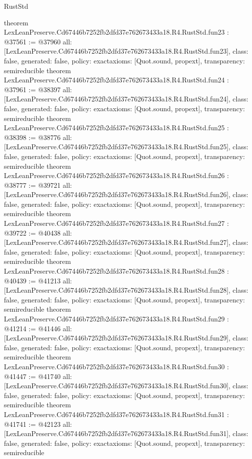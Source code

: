 \begin{lexlean}{RustStd}
\begin{coremodule}
{}
theorem LexLeanPreserve.Cd67446b7252fb2dfd37e762673433a18.R4.RustStd.fun23 : @37561 := @37960 {
  all: [LexLeanPreserve.Cd67446b7252fb2dfd37e762673433a18.R4.RustStd.fun23],
  class: false,
  generated: false,
  policy: exact{axioms: [Quot.sound, propext]},
  transparency: semireducible
}
theorem LexLeanPreserve.Cd67446b7252fb2dfd37e762673433a18.R4.RustStd.fun24 : @37961 := @38397 {
  all: [LexLeanPreserve.Cd67446b7252fb2dfd37e762673433a18.R4.RustStd.fun24],
  class: false,
  generated: false,
  policy: exact{axioms: [Quot.sound, propext]},
  transparency: semireducible
}
theorem LexLeanPreserve.Cd67446b7252fb2dfd37e762673433a18.R4.RustStd.fun25 : @38398 := @38776 {
  all: [LexLeanPreserve.Cd67446b7252fb2dfd37e762673433a18.R4.RustStd.fun25],
  class: false,
  generated: false,
  policy: exact{axioms: [Quot.sound, propext]},
  transparency: semireducible
}
theorem LexLeanPreserve.Cd67446b7252fb2dfd37e762673433a18.R4.RustStd.fun26 : @38777 := @39721 {
  all: [LexLeanPreserve.Cd67446b7252fb2dfd37e762673433a18.R4.RustStd.fun26],
  class: false,
  generated: false,
  policy: exact{axioms: [Quot.sound, propext]},
  transparency: semireducible
}
theorem LexLeanPreserve.Cd67446b7252fb2dfd37e762673433a18.R4.RustStd.fun27 : @39722 := @40438 {
  all: [LexLeanPreserve.Cd67446b7252fb2dfd37e762673433a18.R4.RustStd.fun27],
  class: false,
  generated: false,
  policy: exact{axioms: [Quot.sound, propext]},
  transparency: semireducible
}
theorem LexLeanPreserve.Cd67446b7252fb2dfd37e762673433a18.R4.RustStd.fun28 : @40439 := @41213 {
  all: [LexLeanPreserve.Cd67446b7252fb2dfd37e762673433a18.R4.RustStd.fun28],
  class: false,
  generated: false,
  policy: exact{axioms: [Quot.sound, propext]},
  transparency: semireducible
}
theorem LexLeanPreserve.Cd67446b7252fb2dfd37e762673433a18.R4.RustStd.fun29 : @41214 := @41446 {
  all: [LexLeanPreserve.Cd67446b7252fb2dfd37e762673433a18.R4.RustStd.fun29],
  class: false,
  generated: false,
  policy: exact{axioms: [Quot.sound, propext]},
  transparency: semireducible
}
theorem LexLeanPreserve.Cd67446b7252fb2dfd37e762673433a18.R4.RustStd.fun30 : @41447 := @41740 {
  all: [LexLeanPreserve.Cd67446b7252fb2dfd37e762673433a18.R4.RustStd.fun30],
  class: false,
  generated: false,
  policy: exact{axioms: [Quot.sound, propext]},
  transparency: semireducible
}
theorem LexLeanPreserve.Cd67446b7252fb2dfd37e762673433a18.R4.RustStd.fun31 : @41741 := @42123 {
  all: [LexLeanPreserve.Cd67446b7252fb2dfd37e762673433a18.R4.RustStd.fun31],
  class: false,
  generated: false,
  policy: exact{axioms: [Quot.sound, propext]},
  transparency: semireducible
}
\end{coremodule}
\end{lexlean}
